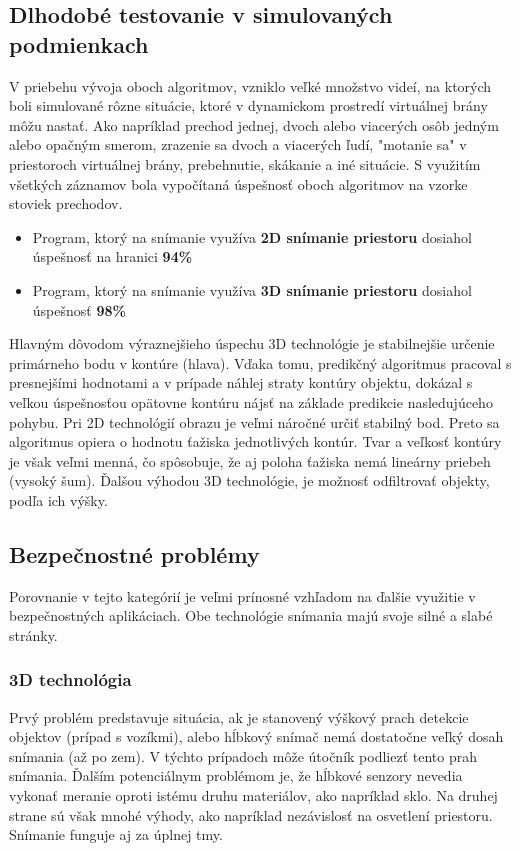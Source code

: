 \subsection{Dlhodobé testovanie v simulovaných podmienkach}
V priebehu vývoja oboch algoritmov, vzniklo veľké množstvo videí, na ktorých boli simulované rôzne situácie, ktoré v dynamickom prostredí virtuálnej brány môžu nastať. Ako napríklad prechod jednej, dvoch alebo viacerých osôb jedným alebo opačným smerom, zrazenie sa dvoch a viacerých ľudí, "motanie sa" v priestoroch virtuálnej brány, prebehnutie, skákanie a iné situácie. S využitím všetkých záznamov bola vypočítaná úspešnosť oboch algoritmov na vzorke stoviek prechodov.    

\begin{itemize}
\item Program, ktorý na snímanie využíva \textbf{2D snímanie priestoru} dosiahol úspešnosť na hranici \textbf{94\%}
\item Program, ktorý na snímanie využíva \textbf{3D snímanie priestoru} dosiahol úspešnosť \textbf{98\%}
\end{itemize}

Hlavným dôvodom výraznejšieho úspechu 3D technológie je stabilnejšie určenie primárneho bodu v kontúre (hlava). Vďaka tomu, predikčný algoritmus pracoval s presnejšími hodnotami a v prípade náhlej straty kontúry objektu, dokázal s veľkou úspešnosťou opätovne kontúru nájsť na základe predikcie nasledujúceho pohybu. Pri 2D technológií obrazu je veľmi náročné určiť stabilný bod. Preto sa algoritmus opiera o hodnotu ťažiska jednotlivých kontúr. Tvar a veľkosť kontúry je však veľmi menná, čo spôsobuje, že aj poloha ťažiska nemá lineárny priebeh (vysoký šum). Ďalšou výhodou 3D technológie, je možnosť odfiltrovať objekty, podľa ich výšky.

\vspace{5mm}


\subsection{Bezpečnostné problémy}
Porovnanie v tejto kategórií je veľmi prínosné vzhľadom na ďalšie využitie v bezpečnostných aplikáciach. Obe technológie snímania majú svoje silné a slabé stránky.

\subsubsection{3D technológia}
Prvý problém predstavuje situácia, ak je stanovený výškový prach detekcie objektov (prípad s vozíkmi), alebo hĺbkový snímač nemá dostatočne veľký dosah snímania (až po zem). V týchto prípadoch môže útočník podliezť tento prah snímania. Ďalším potenciálnym problémom je, že hĺbkové senzory nevedia vykonať meranie oproti istému druhu materiálov, ako napríklad sklo. Na druhej strane sú však mnohé výhody, ako napríklad  nezávislosť na osvetlení priestoru. Snímanie funguje aj za úplnej tmy. 

